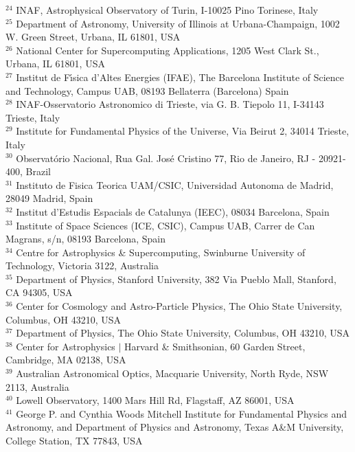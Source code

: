 {{$^{24}$ INAF, Astrophysical Observatory of Turin, I-10025 Pino Torinese, Italy\\
$^{25}$ Department of Astronomy, University of Illinois at Urbana-Champaign, 1002 W. Green Street, Urbana, IL 61801, USA\\
$^{26}$ National Center for Supercomputing Applications, 1205 West Clark St., Urbana, IL 61801, USA\\
$^{27}$ Institut de F\'{\i}sica d'Altes Energies (IFAE), The Barcelona Institute of Science and Technology, Campus UAB, 08193 Bellaterra (Barcelona) Spain\\
$^{28}$ INAF-Osservatorio Astronomico di Trieste, via G. B. Tiepolo 11, I-34143 Trieste, Italy\\
$^{29}$ Institute for Fundamental Physics of the Universe, Via Beirut 2, 34014 Trieste, Italy\\
$^{30}$ Observat\'orio Nacional, Rua Gal. Jos\'e Cristino 77, Rio de Janeiro, RJ - 20921-400, Brazil\\
$^{31}$ Instituto de Fisica Teorica UAM/CSIC, Universidad Autonoma de Madrid, 28049 Madrid, Spain\\
$^{32}$ Institut d'Estudis Espacials de Catalunya (IEEC), 08034 Barcelona, Spain\\
$^{33}$ Institute of Space Sciences (ICE, CSIC),  Campus UAB, Carrer de Can Magrans, s/n,  08193 Barcelona, Spain\\
$^{34}$ Centre for Astrophysics \& Supercomputing, Swinburne University of Technology, Victoria 3122, Australia\\
$^{35}$ Department of Physics, Stanford University, 382 Via Pueblo Mall, Stanford, CA 94305, USA\\
$^{36}$ Center for Cosmology and Astro-Particle Physics, The Ohio State University, Columbus, OH 43210, USA\\
$^{37}$ Department of Physics, The Ohio State University, Columbus, OH 43210, USA\\
$^{38}$ Center for Astrophysics $\vert$ Harvard \& Smithsonian, 60 Garden Street, Cambridge, MA 02138, USA\\
$^{39}$ Australian Astronomical Optics, Macquarie University, North Ryde, NSW 2113, Australia\\
$^{40}$ Lowell Observatory, 1400 Mars Hill Rd, Flagstaff, AZ 86001, USA\\
$^{41}$ George P. and Cynthia Woods Mitchell Institute for Fundamental Physics and Astronomy, and Department of Physics and Astronomy, Texas A\&M University, College Station, TX 77843,  USA\\
}}
